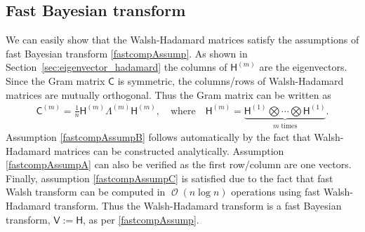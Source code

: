 \documentclass[graybox,footinfo]{svmult}
\DeclareMathOperator{\Order}{{\mathcal O}}
\newcommand{\mSigma}{\mathsf{\Sigma}}
\newcommand{\mB}{\mathsf{B}}
\newcommand{\mA}{\mathsf{A}}
\newcommand{\mC}{\mathsf{C}}
\newcommand{\mLambda}{\mathsf{\Lambda}}
\newcommand{\mH}{\mathsf{H}}
\newcommand{\mV}{\mathsf{V}}
\newcommand{\JRNote}[1]{{\textcolor{green}{JR: #1}}}
\begin{document}

\subsection{Fast Bayesian transform}
We can easily show that the Walsh-Hadamard matrices satisfy the assumptions of fast Bayesian transform \eqref{fastcompAssump}. As shown in Section~\ref{sec:eigenvector_hadamard} the columns of $\mH^{({m})}$ are the eigenvectors. Since the Gram matrix $\mC$ is symmetric, the columns/rows of Walsh-Hadamard matrices are mutually orthogonal. Thus the Gram matrix can be written as 
\begin{align}
\label{eqn:hadamard_fwht}
\mC^{(m)} = \frac{1}{n} \mH^{(m)} \mLambda^{(m)} \mH^{(m)}, \quad \text{where} \quad \mH^{({m})} = \underbrace{ \mH^{(1)} \bigotimes \cdots \bigotimes \mH^{(1)} }_{m \; \text{times}}.
\end{align}
Assumption \eqref{fastcompAssumpB} follows automatically by the fact that Walsh-Hadamard matrices can be constructed analytically. Assumption \eqref{fastcompAssumpA} can also be verified as the first row/column are one vectors. Finally, assumption \eqref{fastcompAssumpC} is satisfied due to the fact that fast Walsh transform can be computed in $\Order({n \log n})$ operations using fast Walsh-Hadamard transform.
Thus the Walsh-Hadamard transform is a fast Bayesian transform, $\mV := \mH$, as per \eqref{fastcompAssump}.
\end{document}
